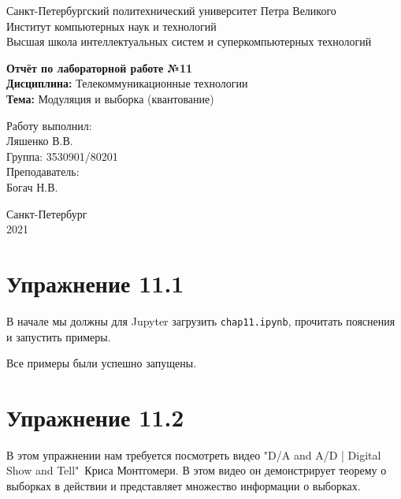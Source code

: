 \documentclass[a4paper,12pt]{report}
\begin{document}
 

\begin{titlepage}
\newpage
	\begin{center}
		\large Санкт-Петербургский политехнический университет Петра Великого\\
		Институт компьютерных наук и технологий\\
		Высшая школа интеллектуальных систем и суперкомпьютерных технологий\\
	\end{center}
\vspace{7cm}

\begin{center}
		\large \textbf{Отчёт по лабораторной работе №11} \\
		\textbf{Дисциплина:} Телекоммуникационные технологии\\
		\textbf{Тема:} Модуляция и выборка (квантование)
\end{center}
\vspace{4cm}
	
\begin{flushright}
		\large Работу выполнил:\\ Ляшенко В.В.\\
		Группа: 3530901/80201\\
		Преподаватель:\\ Богач Н.В.
\end{flushright}

\vspace{\fill}
\begin{center}
	\large Санкт-Петербург\\ 2021
	\end{center}
\end{titlepage}

\tableofcontents
\listoffigures
\lstlistoflistings

\chapter{Упражнение 11.1}
    В начале мы должны для Jupyter загрузить \texttt{chap11.ipynb}, прочитать пояснения и запустить примеры.
    
    Все примеры были успешно запущены.

\chapter{Упражнение 11.2}
    В этом упражнении нам требуется посмотреть видео "D/A and A/D | Digital Show and Tell"\ Криса Монтгомери. В этом видео он демонстрирует теорему о выборках в действии и представляет множество информации о выборках. 
    
\end{document}
